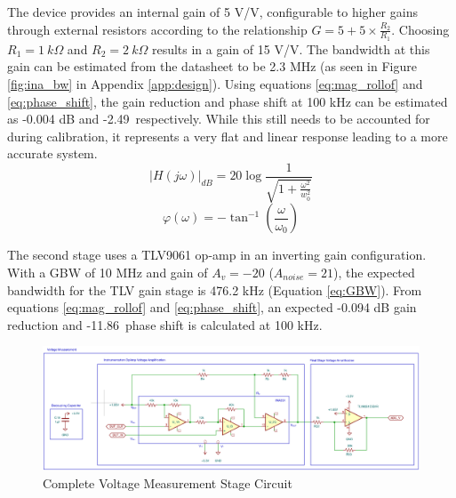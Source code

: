 The device provides an internal gain of 5 V/V, configurable to higher gains through external resistors according to the relationship $G = 5 + 5\times \frac{R_2}{R_1}$. Choosing $R_1=1~k\Omega$ and $R_2=2~k\Omega$ results in a gain of 15 V/V. The bandwidth at this gain can be estimated from the datasheet to be 2.3 MHz (as seen in Figure \ref{fig:ina_bw} in Appendix \ref{app:design}). Using equations \ref{eq:mag_rollof} and \ref{eq:phase_shift}, the gain reduction and phase shift at 100 kHz can be estimated as -0.004 dB and -2.49\textdegree\ respectively. While this still needs to be accounted for during calibration, it represents a very flat and linear response leading to a more accurate system.
\begin{equation}
    |H(j\omega)|_{dB} = 20\log\frac{1}{\sqrt{1+\frac{\omega^2}{w_0^2}}}
    \label{eq:mag_rollof}
\end{equation}
\begin{equation}
    \varphi(\omega) = -\tan^{-1}(\frac{\omega}{\omega_0})
    \label{eq:phase_shift}
\end{equation}

The second stage uses a TLV9061 op-amp in an inverting gain configuration.  With a GBW of 10 MHz and gain of $A_v=-20$ ($A_{noise}=21$), the expected bandwidth for the TLV gain stage is 476.2 kHz (Equation \ref{eq:GBW}). From equations \ref{eq:mag_rollof} and \ref{eq:phase_shift}, an expected -0.094 dB gain reduction and -11.86\textdegree\ phase shift is calculated at 100 kHz. 

\begin{figure}[H]
    \centering
    \includegraphics[width=\textwidth]{VMeasSchem.png}
    \caption{Complete Voltage Measurement Stage Circuit}
    \label{fig:vmeas_stage_circuit}
\end{figure}

